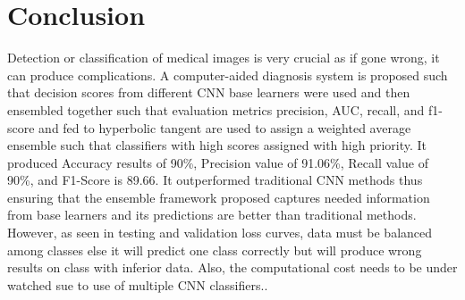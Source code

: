 \documentclass{ieeeaccess}
\begin{document}
\section{Conclusion}
Detection or classification of medical images is very crucial as if gone wrong, it can produce complications. A computer-aided diagnosis system is proposed such that decision scores from different CNN base learners were used and then ensembled together such that evaluation metrics precision, AUC, recall, and f1-score and fed to hyperbolic tangent are used to assign a weighted average ensemble such that classifiers with high scores assigned with high priority. It produced Accuracy results of 90\%, Precision value of 91.06\%, Recall value of 90\%, and F1-Score is 89.66. It outperformed traditional CNN methods thus ensuring that the ensemble framework proposed captures needed information from base learners and its predictions are better than traditional methods. However, as seen in testing and validation loss curves, data must be balanced among classes else it will predict one class correctly but will produce wrong results on class with inferior data. Also, the computational cost needs to be under watched sue to use of multiple CNN classifiers..
\end{document}
